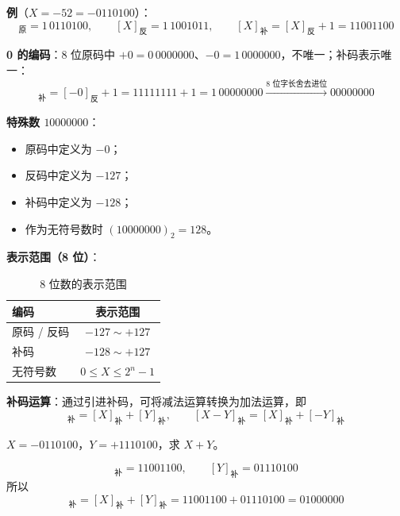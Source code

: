 \textbf{例}（$X=-52=-0110100$）：
\begin{equation}
	[X]_{\text{原}}=1\,0110100,\qquad [X]_{\text{反}}=1\,1001011,\qquad
	[X]_{\text{补}}=[X]_{\text{反}}+1=11001100
	\label{eq:补码:三种编码例}
\end{equation}

\textbf{0 的编码}：8 位原码中 $+0=0\,0000000$、$-0=1\,0000000$，不唯一；补码表示唯一：
\begin{equation}
	[-0]_{\text{补}}=[-0]_{\text{反}}+1=11111111+1=1\,00000000
	\xrightarrow{\text{8 位字长舍去进位}}00000000
	\label{eq:补码:0的补码}
\end{equation}

\textbf{特殊数 $10000000$}：
\begin{itemize}
	\item 原码中定义为 $-0$；
	\item 反码中定义为 $-127$；
	\item 补码中定义为 $-128$；
	\item 作为无符号数时 $(10000000)_{2}=128$。
\end{itemize}

\textbf{表示范围（8 位）}：

\begin{table}[H]
\centering
\caption{8 位数的表示范围}
\label{tab:补码:表示范围}
\begin{tabular}{lc}
	\toprule
	编码 & 表示范围 \\
	\midrule
	原码 / 反码 & $-127\sim+127$ \\
	补码 & $-128\sim+127$ \\
	无符号数 & $0\le X\le 2^{n}-1$ \\
	\bottomrule
\end{tabular}
\end{table}

\textbf{补码运算}：通过引进补码，可将减法运算转换为加法运算，即
\begin{equation}
	[X+Y]_{\text{补}}=[X]_{\text{补}}+[Y]_{\text{补}},\qquad
	[X-Y]_{\text{补}}=[X]_{\text{补}}+[-Y]_{\text{补}}
	\label{eq:补码:加减运算}
\end{equation}

\begin{longexample}[补码加法]
	\label{ex:补码加法}
	$X=-0110100$，$Y=+1110100$，求 $X+Y$。

	\begin{solution}
		\begin{equation}
			[X]_{\text{补}}=11001100,\qquad [Y]_{\text{补}}=01110100
			\label{eq:补码:例补码}
		\end{equation}
		所以
		\begin{equation}
			[X+Y]_{\text{补}}=[X]_{\text{补}}+[Y]_{\text{补}}
			=11001100+01110100=01000000
			\label{eq:补码:例结果}
		\end{equation}
	\end{solution}
\end{longexample}

